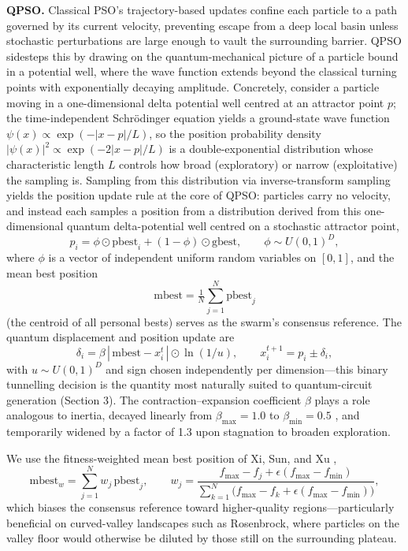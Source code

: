 \documentclass[11pt]{article}
\begin{document}
\textbf{QPSO.} Classical PSO's trajectory-based updates confine each particle to a path governed by its current velocity, preventing escape from a deep local basin unless stochastic perturbations are large enough to vault the surrounding barrier. QPSO sidesteps this by drawing on the quantum-mechanical picture of a particle bound in a potential well, where the wave function extends beyond the classical turning points with exponentially decaying amplitude. Concretely, consider a particle moving in a one-dimensional delta potential well centred at an attractor point $p$; the time-independent Schr\"odinger equation yields a ground-state wave function $\psi(x) \propto \exp(-|x-p|/L)$, so the position probability density $|\psi(x)|^2 \propto \exp(-2|x-p|/L)$ is a double-exponential distribution whose characteristic length $L$ controls how broad (exploratory) or narrow (exploitative) the sampling is. Sampling from this distribution via inverse-transform sampling yields the position update rule at the core of QPSO: particles carry no velocity, and instead each samples a position from a distribution derived from this one-dimensional quantum delta-potential well centred on a stochastic attractor point,
\begin{equation}
p_i = \phi \odot \mathrm{pbest}_i + (1-\phi)\odot\mathrm{gbest}, \qquad \phi \sim U(0,1)^D,
\end{equation}
where $\phi$ is a vector of independent uniform random variables on $[0,1]$, and the mean best position
\begin{equation}
\mathrm{mbest} = \tfrac{1}{N}\sum_{j=1}^N \mathrm{pbest}_j
\end{equation}
(the centroid of all personal bests) serves as the swarm's consensus reference. The quantum displacement and position update are
\begin{equation}
\delta_i = \beta\, |\,\mathrm{mbest} - x_i^t\,| \odot \ln(1/u), \qquad x_i^{t+1} = p_i \pm \delta_i,
\end{equation}
with $u \sim U(0,1)^D$ and sign chosen independently per dimension---this binary tunnelling decision is the quantity most naturally suited to quantum-circuit generation (Section 3). The contraction--expansion coefficient $\beta$ plays a role analogous to inertia, decayed linearly from $\beta_{\max}=1.0$ to $\beta_{\min}=0.5$ \cite{sun2012}, and temporarily widened by a factor of 1.3 upon stagnation to broaden exploration.

We use the fitness-weighted mean best position of Xi, Sun, and Xu \cite{xi2008},
\begin{equation}
\mathrm{mbest}_w = \sum_{j=1}^N w_j\, \mathrm{pbest}_j, \qquad w_j = \frac{f_{\max}-f_j+\epsilon(f_{\max}-f_{\min})}{\sum_{k=1}^N \big(f_{\max}-f_k+\epsilon(f_{\max}-f_{\min})\big)},
\end{equation}
which biases the consensus reference toward higher-quality regions---particularly beneficial on curved-valley landscapes such as Rosenbrock, where particles on the valley floor would otherwise be diluted by those still on the surrounding plateau.
\end{document}

